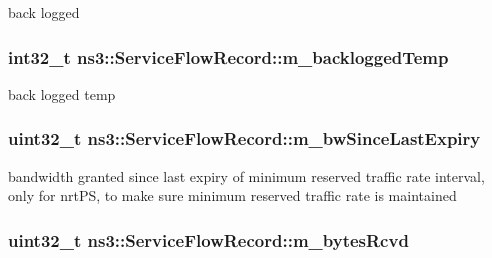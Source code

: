 back logged 

\subsubsection[{\texorpdfstring{m\+\_\+backlogged\+Temp}{m_backloggedTemp}}]{\setlength{\rightskip}{0pt plus 5cm}int32\+\_\+t ns3\+::\+Service\+Flow\+Record\+::m\+\_\+backlogged\+Temp\hspace{0.3cm}{\ttfamily [private]}}\hypertarget{classns3_1_1ServiceFlowRecord_ae87a868de306eba5eebf360c17e41e92}{}\label{classns3_1_1ServiceFlowRecord_ae87a868de306eba5eebf360c17e41e92}


back logged temp 

\subsubsection[{\texorpdfstring{m\+\_\+bw\+Since\+Last\+Expiry}{m_bwSinceLastExpiry}}]{\setlength{\rightskip}{0pt plus 5cm}uint32\+\_\+t ns3\+::\+Service\+Flow\+Record\+::m\+\_\+bw\+Since\+Last\+Expiry\hspace{0.3cm}{\ttfamily [private]}}\hypertarget{classns3_1_1ServiceFlowRecord_ac1f0e1c94ddc9bac064a534ed07df9b3}{}\label{classns3_1_1ServiceFlowRecord_ac1f0e1c94ddc9bac064a534ed07df9b3}
bandwidth granted since last expiry of minimum reserved traffic rate interval, only for nrt\+PS, to make sure minimum reserved traffic rate is maintained 
\subsubsection[{\texorpdfstring{m\+\_\+bytes\+Rcvd}{m_bytesRcvd}}]{\setlength{\rightskip}{0pt plus 5cm}uint32\+\_\+t ns3\+::\+Service\+Flow\+Record\+::m\+\_\+bytes\+Rcvd\hspace{0.3cm}{\ttfamily [private]}}\hypertarget{classns3_1_1ServiceFlowRecord_a599566b4d725dfb1baeb9f540cb4a162}{}\label{classns3_1_1ServiceFlowRecord_a599566b4d725dfb1baeb9f540cb4a162}



